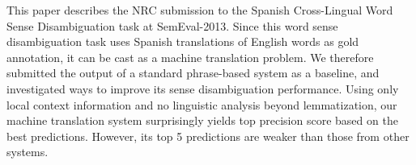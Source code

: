 This paper describes the NRC submission to the Spanish Cross-Lingual Word Sense Disambiguation task at SemEval-2013.  Since this word sense disambiguation task
 uses Spanish translations of English words as gold annotation, it can be cast
 as a machine translation problem. We therefore submitted the output of a
 standard phrase-based system as a baseline, and investigated ways to improve
 its sense disambiguation performance.  Using only local context information and
 no linguistic analysis beyond lemmatization, our machine translation system
 surprisingly yields top precision score based on the best predictions. However,
 its top 5 predictions are weaker than those from other systems.

